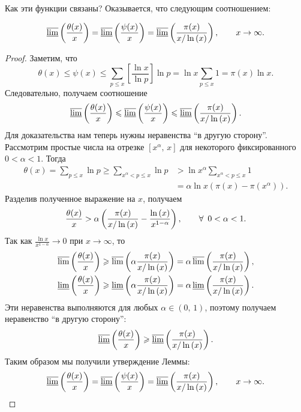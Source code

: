 Как эти функции связаны? Оказывается, что следующим соотношением:
\begin{nlemma}
\label{lm:I-1}
    \[
        \operatorname*{\overline{\underline{lim}}}\left( \frac{\theta(x)}{x} \right)
        = \operatorname*{\overline{\underline{lim}}}\left( \frac{\psi(x)}{x} \right)
        = \operatorname*{\overline{\underline{lim}}}\left( \frac{\pi(x)}{x / \operatorname{ln}\left( x \right)} \right),
        \qquad x \to \infty.
    \]
\end{nlemma}
\begin{proof}
    Заметим, что
    \[
        \theta(x) \le \psi(x)
        \le \sum_{p \le x} \left[ \frac{\ln{x}}{\ln{p}} \right] \ln{p} 
        = \ln{x} \sum_{p \le x} 1 = \pi(x)\ln{x}.
    \]
    Следовательно, получаем соотношение
    \[
        \operatorname*{\overline{\underline{lim}}}\left( \frac{\theta(x)}{x} \right)
        \leqslant \operatorname*{\overline{\underline{lim}}}\left( \frac{\psi(x)}{x} \right)
        \leqslant \operatorname*{\overline{\underline{lim}}}\left( \frac{\pi(x)}{x / \operatorname{ln}\left( x \right)} \right).
    \]
    Для доказательства нам теперь нужны неравенства ``в другую сторону''. Рассмотрим простые числа на отрезке $\left[ x^\alpha,\, x \right]$ для некоторого фиксированного $0 < \alpha < 1$. 
    Тогда
    \begin{align*}
        \theta(x) = \sum_{p \le x} \ln{p} \ge \sum_{x^\alpha < p \le x} \ln{p} &> \ln{x^\alpha} \sum_{x^\alpha < p \le x} 1 \\
        &= \alpha \ln{x}\left( \pi(x) - \pi\left(x^{\alpha}\right) \right).
    \end{align*}
    Разделив полученное выражение на $x$, получаем
    \[
        \frac{\theta(x)}{x} 
        > \alpha\left( \frac{\pi(x)}{\sfrac{x}{\ln{x}}} - \frac{\ln{x}}{x^{1 - \alpha}} \right),
        \qquad \forall\ 0 < \alpha < 1.
    \]
    Так как $\frac{\ln{x}}{x^{1-\alpha}} \to 0$ при $x \to \infty$, то
    \begin{align*}
        \varlimsup\left( \frac{\theta(x)}{x} \right) &
        \geqslant \varlimsup\left( \alpha\frac{\pi(x)}{x / \operatorname{ln}\left( x \right)} \right) 
        = \alpha \varlimsup\left( \frac{\pi(x)}{x / \operatorname{ln}\left( x \right)} \right), \\
        \varliminf\left( \frac{\theta(x)}{x} \right) &
        \geqslant \varliminf\left( \alpha\frac{\pi(x)}{x / \operatorname{ln}\left( x \right)} \right) 
        = \alpha \varliminf\left( \frac{\pi(x)}{x / \operatorname{ln}\left( x \right)} \right).
    \end{align*}
    Эти неравенства выполняются для любых $\alpha \in (0,\, 1)$, поэтому получаем неравенство ``в другую сторону'':
    \[
        \operatorname*{\overline{\underline{lim}}}\left( \frac{\theta(x)}{x} \right)
        \geqslant \operatorname*{\overline{\underline{lim}}}\left( \frac{\pi(x)}{x / \operatorname{ln}\left( x \right)} \right).
    \]
    Таким образом мы получили утверждение Леммы:
    \[
        \operatorname*{\overline{\underline{lim}}}\left( \frac{\theta(x)}{x} \right)
        = \operatorname*{\overline{\underline{lim}}}\left( \frac{\psi(x)}{x} \right)
        = \operatorname*{\overline{\underline{lim}}}\left( \frac{\pi(x)}{x / \operatorname{ln}\left( x \right)} \right),
        \qquad x \to \infty.
    \]
\end{proof}

